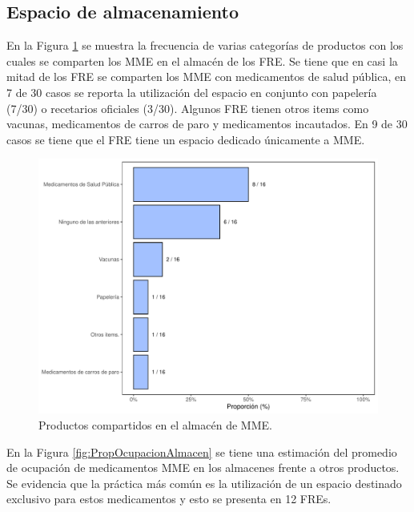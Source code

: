 \documentclass[
]{book}
\begin{document}
\hypertarget{espacio-de-almacenamiento}{%
\subsection{Espacio de almacenamiento}\label{espacio-de-almacenamiento}}

En la Figura \ref{fig:ProductosCompartidos1} se muestra la frecuencia de varias categorías de productos con los cuales se comparten los MME en el almacén de los FRE. Se tiene que en casi la mitad de los FRE se comparten los MME con medicamentos de salud pública, en 7 de 30 casos se reporta la utilización del espacio en conjunto con papelería (7/30) o recetarios oficiales (3/30). Algunos FRE tienen otros items como vacunas, medicamentos de carros de paro y medicamentos incautados. En 9 de 30 casos se tiene que el FRE tiene un espacio dedicado únicamente a MME.

\begin{figure}[!b]

{\centering \includegraphics[width=0.9\linewidth]{InformeFinal_files/figure-latex/ProductosCompartidos1-1} 

}

\caption{Productos compartidos en el almacén de MME.}\label{fig:ProductosCompartidos1}
\end{figure}

En la Figura \ref{fig:PropOcupacionAlmacen} se tiene una estimación del promedio de ocupación de medicamentos MME en los almacenes frente a otros productos. Se evidencia que la práctica más común es la utilización de un espacio destinado exclusivo para estos medicamentos y esto se presenta en 12 FREs.
\end{document}
